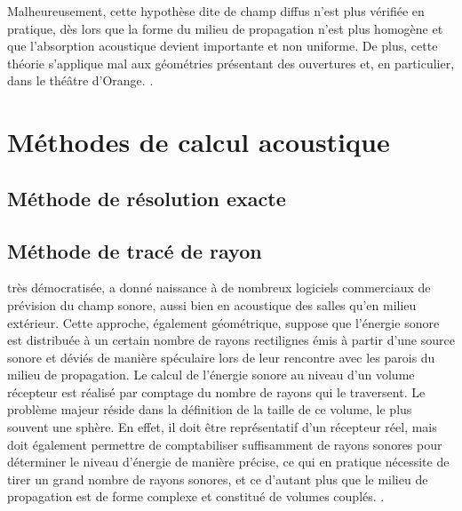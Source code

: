 Malheureusement, cette hypothèse dite de champ diffus n’est plus vérifiée en pratique, dès lors que la forme du milieu de propagation n’est plus homogène et que l’absorption acoustique devient importante et non uniforme. De plus, cette théorie s’applique mal aux géométries présentant des ouvertures et, en particulier, dans le théâtre d'Orange. \cite{picaut}.

\section{Méthodes de calcul acoustique} 

	\subsection{Méthode de résolution exacte}
%	
	
	\subsection{Méthode de tracé de rayon}
	très démocratisée, a donné naissance à de
nombreux logiciels commerciaux de prévision du champ sonore, aussi bien en acoustique des salles
qu’en milieu extérieur. Cette approche, également géométrique, suppose que l’énergie sonore est
distribuée à un certain nombre de rayons rectilignes émis à partir d’une source sonore et déviés de
manière spéculaire lors de leur rencontre avec les parois du milieu de propagation. Le calcul de
l’énergie sonore au niveau d’un volume récepteur est réalisé par comptage du nombre de rayons qui
le traversent. Le problème majeur réside dans la définition de la taille de ce volume, le plus souvent
une sphère. En effet, il doit être représentatif d’un récepteur réel, mais doit également permettre de
comptabiliser suffisamment de rayons sonores pour déterminer le niveau d’énergie de manière
précise, ce qui en pratique nécessite de tirer un grand nombre de rayons sonores, et ce d’autant plus
que le milieu de propagation est de forme complexe et constitué de volumes couplés. \cite{picaut}.
	
